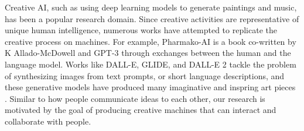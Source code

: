 
 
Creative AI, such as using deep learning models to generate paintings and music, has been a popular research domain. Since creative activities are representative of unique human intelligence, numerous works have attempted to replicate the creative process on machines.
For example, Pharmako-AI \citep{allado-mcdowell_okojie_2020} is a book co-written by K Allado-McDowell and GPT-3 \citep{gpt3} through exchanges between the human and the language model. 
Works like DALL-E, GLIDE, and DALL-E 2 tackle the problem of synthesizing images from text prompts, or short language descriptions, and these generative models have produced many imaginative and inspring art pieces \citep{dallePaper,glidePaper,dalle2Paper}. 
Similar to how people communicate ideas to each other, our research is motivated by the goal of producing creative machines that can interact and collaborate with people. 

